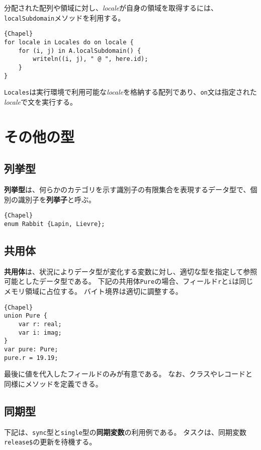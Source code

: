 \documentclass[10pt,a4paper]{book}
\begin{document}
分配された配列や領域に対し、\textit{locale}が自身の領域を取得するには、\verb#localSubdomain#メソッドを利用する。

\begin{Verbatim}{Chapel}
for locale in Locales do on locale {
	for (i, j) in A.localSubdomain() {
		writeln((i, j), " @ ", here.id);
	}
}
\end{Verbatim}

\verb#Locales#は実行環境で利用可能な\textit{locale}を格納する配列であり、\verb#on#文は指定された\textit{locale}で文を実行する。

\chapter{その他の型}

\section{列挙型\label{sec:enum}}

\textbf{列挙型}は、何らかのカテゴリを示す識別子の有限集合を表現するデータ型で、個別の識別子を\textbf{列挙子}と呼ぶ。

\begin{Verbatim}{Chapel}
enum Rabbit {Lapin, Lievre};
\end{Verbatim}

\section{共用体}

\textbf{共用体}は、状況によりデータ型が変化する変数に対し、適切な型を指定して参照可能としたデータ型である。
下記の共用体\verb#Pure#の場合、フィールド\verb#r#と\verb#i#は同じメモリ領域に占位する。
バイト境界は適切に調整する。

\begin{Verbatim}{Chapel}
union Pure {
	var r: real;
	var i: imag;
}
var pure: Pure;
pure.r = 19.19;

\end{Verbatim}

最後に値を代入したフィールドのみが有意である。
なお、クラスやレコードと同様にメソッドを定義できる。

\section{同期型}

下記は、\verb#sync#型と\verb#single#型の\textbf{同期変数}の利用例である。
タスクは、同期変数\verb#release$#の更新を待機する。
\end{document}
